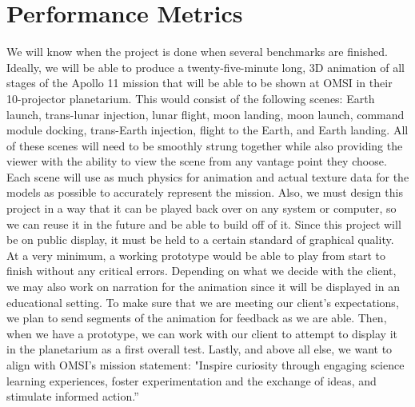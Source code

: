 \documentclass[onecolumn, draftclsnofoot,10pt, compsoc]{IEEEtran}
\begin{document}
\section{Performance Metrics}
We will know when the project is done when several benchmarks are finished. Ideally, we will be able to produce a twenty-five-minute long, 3D animation of all stages of the Apollo 11 mission that will be able to be shown at OMSI in their 10-projector planetarium. This would consist of the following scenes: Earth launch, trans-lunar injection, lunar flight, moon landing, moon launch, command module docking, trans-Earth injection, flight to the Earth, and Earth landing. All of these scenes will need to be smoothly strung together while also providing the viewer with the ability to view the scene from any vantage point they choose. Each scene will use as much physics for animation and actual texture data for the models as possible to accurately represent the mission. Also, we must design this project in a way that it can be played back over on any system or computer, so we can reuse it in the future and be able to build off of it.
\newline
\newline
Since this project will be on public display, it must be held to a certain standard of graphical quality. At a very minimum, a working prototype would be able to play from start to finish without any critical errors. Depending on what we decide with the client, we may also work on narration for the animation since it will be displayed in an educational setting. To make sure that we are meeting our client's expectations, we plan to send segments of the animation for feedback as we are able. Then, when we have a prototype, we can work with our client to attempt to display it in the planetarium as a first overall test. Lastly, and above all else, we want to align with OMSI’s mission statement: "Inspire curiosity through engaging science learning experiences, foster experimentation and the exchange of ideas, and stimulate informed action.” 
\end{document}
